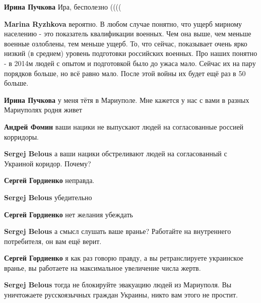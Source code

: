 \begin{itemize}
\begin{itemize}
\textbf{Ирина Пучкова} Ира, бесполезно ((((

\textbf{Marina Ryzhkova} вероятно.
В любом случае понятно, что ущерб мирному населению - это показатель квалификации военных.
Чем она выше, чем меньше военные озлоблены, тем меньше ущерб.
То, что сейчас, показывает очень ярко низкий (в среднем) уровень подготовки российских военных.
Про наших понятно - в 2014м людей с опытом и подготовкой было до ужаса мало. Сейчас их на пару порядков больше, но всё равно мало.
После этой войны их будет ещё раз в 50 больше.

\textbf{Ирина Пучкова} у меня тётя в Мариуполе. Мне кажется у нас с вами в разных Мариуполях родня живет

\textbf{Андрей Фомин} ваши нацики не выпускают людей на согласованные россией корридоры.

\textbf{Sergej Belous} а ваши нацики обстреливают людей на согласованный с Украиной коридор. Почему?

\textbf{Сергей Гордиенко} неправда.

\textbf{Sergej Belous} убедительно

\textbf{Сергей Гордиенко} нет желания убеждать

\textbf{Sergej Belous} а смысл слушать ваше вранье? Работайте на внутреннего потребителя, он вам ещё верит.

\textbf{Сергей Гордиенко} я как раз говорю правду, а вы ретранслируете украинское вранье, вы работаете на максимальное увеличение числа жертв.

\textbf{Sergej Belous} тогда не блокируйте эвакуацию людей из Мариуполя. Вы уничтожаете русскоязычных граждан Украины, никто вам этого не простит.

\end{itemize} %

\end{itemize} %
